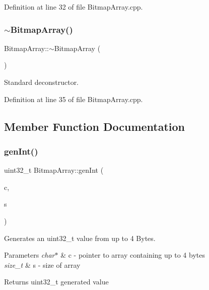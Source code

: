 Definition at line 32 of file Bitmap\+Array.\+cpp.

\mbox{\label{classBitmapArray_acc21c3148de08fb85d2939821f9f2cf0}} 
\subsubsection{\texorpdfstring{$\sim$BitmapArray()}{~BitmapArray()}}
{\footnotesize\ttfamily Bitmap\+Array\+::$\sim$\+Bitmap\+Array (\begin{DoxyParamCaption}{ }\end{DoxyParamCaption})\hspace{0.3cm}{\ttfamily [virtual]}}

Standard deconstructor. 

Definition at line 35 of file Bitmap\+Array.\+cpp.



\subsection{Member Function Documentation}
\mbox{\label{classBitmapArray_a158fbbaa026332a732f644a8c368a2f0}} 
\subsubsection{\texorpdfstring{genInt()}{genInt()}}
{\footnotesize\ttfamily uint32\+\_\+t Bitmap\+Array\+::gen\+Int (\begin{DoxyParamCaption}\item[{char $\ast$}]{c,  }\item[{size\+\_\+t}]{s }\end{DoxyParamCaption})\hspace{0.3cm}{\ttfamily [private]}}



Generates an uint32\+\_\+t value from up to 4 Bytes. 


\begin{DoxyParams}{Parameters}
{\em char$\ast$} & c -\/ pointer to array containing up to 4 bytes \\
\hline
{\em size\+\_\+t} & s -\/ size of array \\
\hline
\end{DoxyParams}
\begin{DoxyReturn}{Returns}
uint32\+\_\+t generated value 
\end{DoxyReturn}


